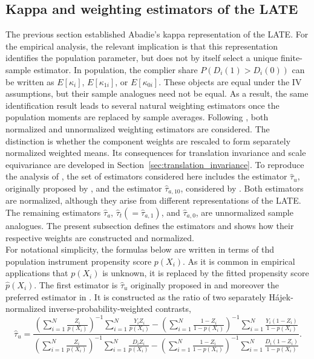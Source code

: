 \documentclass[12pt, a4paper, oneside]{article}
\theoremstyle{plain}
\theoremstyle{definition}
\begin{document}
\subsection{Kappa and weighting estimators of the LATE}
The previous section established Abadie's kappa representation of the LATE. For
the empirical analysis, the relevant implication is that this representation
identifies the population parameter, but does not by itself select a unique
finite-sample estimator. In population, the complier share
$P(D_i(1)>D_i(0))$ can be written as $E[\kappa_i]$, $E[\kappa_{1i}]$, or
$E[\kappa_{0i}]$. These objects are equal under the IV assumptions, but their
sample analogues need not be equal. As a result, the same identification result
leads to several natural weighting estimators once the population moments are
replaced by sample averages.
Following \citet{sloczynski2025abadie}, both normalized and unnormalized weighting
estimators are considered. The distinction is whether the component weights are rescaled
to form separately normalized weighted means. Its consequences for translation
invariance and scale equivariance are developed in
Section~\ref{sec:translation_invariance}.
To reproduce the analysis of \citet{sloczynski2025abadie}, the set of estimators considered here includes the estimator $\hat\tau_u$, originally proposed by \citet{uysal2011three}, and the estimator $\hat\tau_{a,10}$, considered by \citet{abadie2018econometric}.
Both estimators are normalized, although they arise from different representations of the LATE.
The remaining estimators 
$\hat\tau_a$, $\hat\tau_t(=\hat\tau_{a,1})$, and $\hat\tau_{a,0}$, are
unnormalized sample analogues. 
The present subsection defines the estimators and shows how their respective weights are
constructed and normalized.\\
For notational simplicity, the formulas below are written in terms of thd population instrument propensity score $p(X_i)$. As it is common in empirical applications that $p(X_i)$ is unknown, it is replaced by the fitted propensity score $\hat p(X_i)$.
The first estimator is  $\hat\tau_u$ originally proposed in \citep{uysal2011three} and moreover the preferred estimator in \citet{sloczynski2025abadie}. 
It is constructed as 
the ratio of two separately Hájek-normalized inverse-probability-weighted
contrasts,
\begin{equation}
    \hat\tau_u =
    \frac{
        \left(\sum_{i=1}^N \frac{Z_i}{p(X_i)}\right)^{-1}\sum_{i=1}^N \frac{Y_iZ_i}{p(X_i)}
        -
        \left(\sum_{i=1}^N \frac{1-Z_i}{1-p(X_i)}\right)^{-1}\sum_{i=1}^N \frac{Y_i(1-Z_i)}{1-p(X_i)}
    }{
        \left(\sum_{i=1}^N \frac{Z_i}{p(X_i)}\right)^{-1}\sum_{i=1}^N \frac{D_iZ_i}{p(X_i)}
        -
        \left(\sum_{i=1}^N \frac{1-Z_i}{1-p(X_i)}\right)^{-1}\sum_{i=1}^N \frac{D_i(1-Z_i)}{1-p(X_i)}
    }.
    \label{eq:tau_u}
\end{equation}
\end{document}
